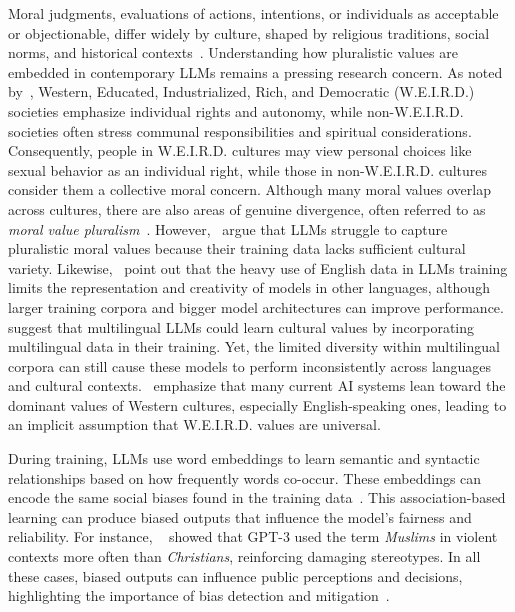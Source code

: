 \documentclass[runningheads]{llncs}
\begin{document}
Moral judgments, evaluations of actions, intentions, or individuals as acceptable or objectionable, differ widely by culture, shaped by religious traditions, social norms, and historical contexts~\cite{Haidt2001,Shweder1997}. Understanding how pluralistic values are embedded in contemporary LLMs remains a pressing research concern.  As noted by~\cite{Graham2016}, Western, Educated, Industrialized, Rich, and Democratic (W.E.I.R.D.) societies emphasize individual rights and autonomy, while non-W.E.I.R.D. societies often stress communal responsibilities and spiritual considerations. Consequently, people in W.E.I.R.D. cultures may view personal choices like sexual behavior as an individual right, while those in non-W.E.I.R.D. cultures consider them a collective moral concern. Although many moral values overlap across cultures, there are also areas of genuine divergence, often referred to as \emph{moral value pluralism}~\cite{Johnson2022,Benkler2023}. However,~\cite{Kharchenko2024} argue that LLMs struggle to capture pluralistic moral values because their training data lacks sufficient cultural variety. Likewise,~\cite{Du2024} point out that the heavy use of English data in LLMs training limits the representation and creativity of models in other languages, although larger training corpora and bigger model architectures can improve performance.~\cite{arora2023probing} suggest that multilingual LLMs could learn cultural values by incorporating multilingual data in their training. Yet, the limited diversity within multilingual corpora can still cause these models to perform inconsistently across languages and cultural contexts.~\cite{Benkler2023} emphasize that many current AI systems lean toward the dominant values of Western cultures, especially English-speaking ones, leading to an implicit assumption that W.E.I.R.D. values are universal.

During training, LLMs use word embeddings to learn semantic and syntactic relationships based on how frequently words co-occur. These embeddings can encode the same social biases found in the training data~\cite{nemani2024gender,mohammadi2025explainability}. This association-based learning can produce biased outputs that influence the model's fairness and reliability. For instance, ~\cite{Johnson2022} showed that GPT-3 used the term \emph{Muslims} in violent contexts more often than \emph{Christians}, reinforcing damaging stereotypes. In all these cases, biased outputs can influence public perceptions and decisions, highlighting the importance of bias detection and mitigation~\cite{Noble2018,Zou2018}.
%
\end{document}
